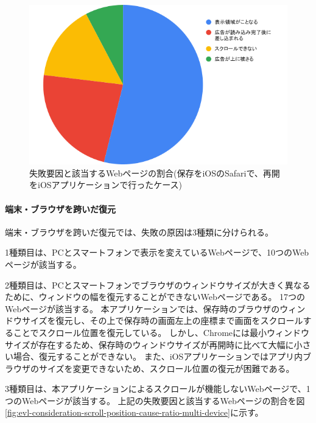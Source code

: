 \begin{figure}[htbp]
  \caption{失敗要因と該当するWebページの割合(保存をiOSのSafariで、再開をiOSアプリケーションで行ったケース)}
  \label{fig:evl-consideration-scroll-position-cause-ratio-ios}
  \begin{center}
    \includegraphics[bb=0 0 600 371,width=15cm]{img/060_evaluation/consideration/scroll_position/cause-ratio-ios.pdf}
  \end{center}
\end{figure}

\paragraph{端末・ブラウザを跨いだ復元}

端末・ブラウザを跨いだ復元では、失敗の原因は3種類に分けられる。

1種類目は、PCとスマートフォンで表示を変えているWebページで、10つのWebページが該当する。

2種類目は、PCとスマートフォンでブラウザのウィンドウサイズが大きく異なるために、ウィンドウの幅を復元することができないWebページである。
17つのWebページが該当する。
本アプリケーションでは、保存時のブラウザのウィンドウサイズを復元し、その上で保存時の画面左上の座標まで画面をスクロールすることでスクロール位置を復元している。
しかし、Chromeには最小ウィンドウサイズが存在するため、保存時のウィンドウサイズが再開時に比べて大幅に小さい場合、復元することができない。
また、iOSアプリケーションではアプリ内ブラウザのサイズを変更できないため、スクロール位置の復元が困難である。

3種類目は、本アプリケーションによるスクロールが機能しないWebページで、1つのWebページが該当する。
上記の失敗要因と該当するWebページの割合を図\ref{fig:evl-consideration-scroll-position-cause-ratio-multi-device}に示す。

